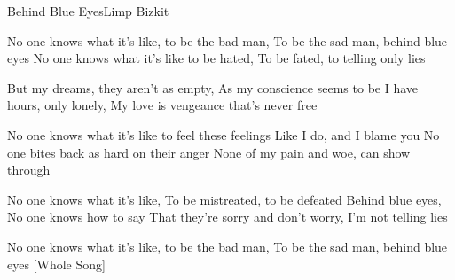 \begin{song}{Behind Blue Eyes}{Limp Bizkit}{}


No one knows what it's like, to be the bad man,
To be the sad man, behind blue eyes
No one knows what it's like to be hated, To be fated, to telling only lies

But my dreams, they aren't as empty, As my conscience seems to be
I have hours, only lonely, My love is vengeance that's never free

No one knows what it's like to feel these feelings
Like I do, and I blame you
No one bites back as hard on their anger
None of my pain and woe, can show through

 

No one knows what it's like, To be mistreated, to be defeated
Behind blue eyes, No one knows how to say
That they're sorry and don't worry, I'm not telling lies

 

No one knows what it's like, to be the bad man,
To be the sad man, behind blue eyes
[Whole Song]
\end{song}
